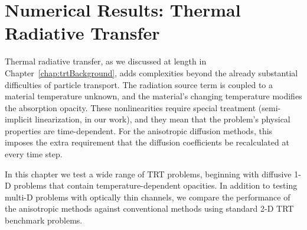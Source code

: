 \chapter{Numerical Results: Thermal Radiative Transfer}
\label{chap:trtNumericalResults}

Thermal radiative transfer, as we discussed at length in
Chapter~\ref{chap:trtBackground}, adds complexities beyond the already
substantial
difficulties of particle transport. The radiation source term is coupled to a
material temperature unknown, and the material's changing temperature modifies
the absorption opacity. These nonlinearities require special treatment
(semi-implicit linearization, in our work), and they mean that the problem's
physical properties are time-dependent. For the anisotropic diffusion methods,
this imposes the extra requirement that the diffusion coefficients be
recalculated at every time step.

In this chapter we test a wide range of TRT problems, beginning with diffusive
1-D problems that
contain temperature-dependent opacities. In addition to testing multi-D problems
with optically thin channels, we compare the performance of the anisotropic
methods against conventional methods using standard 2-D TRT benchmark problems.

